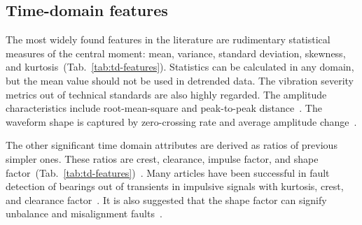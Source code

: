 \subsection{Time-domain features}
The most widely found features in the literature are rudimentary statistical measures of the central moment: mean, variance, standard deviation, skewness, and kurtosis~(Tab.~\ref{tab:td-features}). Statistics can be calculated in any domain, but the mean value should not be used in detrended data. The vibration severity metrics out of technical standards are also highly regarded. The amplitude characteristics include root-mean-square and peak-to-peak distance~\cite{mostafavi_novel_2021}. The waveform shape is captured by zero-crossing rate and average amplitude change~\cite{moctar_time-domain_2023}.

The other significant time domain attributes are derived as ratios of previous simpler ones. These ratios are crest, clearance, impulse factor, and shape factor~(Tab.~\ref{tab:td-features})~\cite{nandi_condition_2019}. Many articles have been successful in fault detection of bearings out of transients in impulsive signals with kurtosis, crest, and clearance factor~\cite{brito_fault_2021}. It is also suggested that the shape factor can signify unbalance and misalignment faults~\cite{nandi_condition_2019}.

